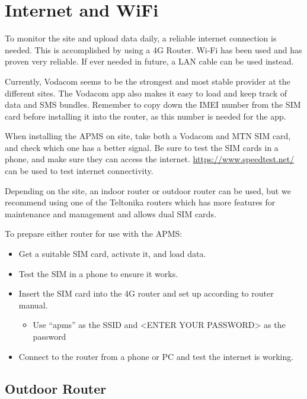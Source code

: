 \documentclass[
  letterpaper,
]{scrbook}
\providecommand{\tightlist}{%
  \setlength{\itemsep}{0pt}\setlength{\parskip}{0pt}}
\begin{document}
\chapter{Internet and WiFi}\label{internet-and-wifi}

To monitor the site and upload data daily, a reliable internet
connection is needed. This is accomplished by using a 4G Router. Wi-Fi
has been used and has proven very reliable. If ever needed in future, a
LAN cable can be used instead.

Currently, Vodacom seems to be the strongest and most stable provider at
the different sites. The Vodacom app also makes it easy to load and keep
track of data and SMS bundles. Remember to copy down the IMEI number
from the SIM card before installing it into the router, as this number
is needed for the app.

When installing the APMS on site, take both a Vodacom and MTN SIM card,
and check which one has a better signal. Be sure to test the SIM cards
in a phone, and make sure they can access the internet.
\url{https://www.speedtest.net/} can be used to test internet
connectivity.

Depending on the site, an indoor router or outdoor router can be used,
but we recommend using one of the Teltonika routers which has more
features for maintenance and management and allows dual SIM cards.

To prepare either router for use with the APMS:

\begin{itemize}
\item
  Get a suitable SIM card, activate it, and load data.
\item
  Test the SIM in a phone to ensure it works.
\item
  Insert the SIM card into the 4G router and set up according to router
  manual.

  \begin{itemize}
  \tightlist
  \item
    Use ``apms'' as the SSID and \textless ENTER YOUR
    PASSWORD\textgreater{} as the password
  \end{itemize}
\item
  Connect to the router from a phone or PC and test the internet is
  working.
\end{itemize}

\section{Outdoor Router}\label{outdoor-router}
\end{document}
